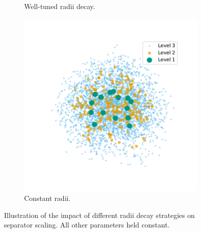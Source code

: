 \begin{figure}[tbhp]
\begin{subfigure}[t]{0.3\linewidth}
		\caption{Well-tuned radii decay.}
		\label{fig:radius_good}
	\end{subfigure}
	\hfill
	\begin{subfigure}[t]{0.3\linewidth}
		\centering
		\includegraphics[width=\linewidth]{graphics/const.pdf}
		\caption{Constant radii.}
		\label{fig:radius_const}
	\end{subfigure}
	\caption{Illustration of the impact of different radii decay strategies on separator scaling. All other parameters held constant.}
	\label{fig:radius_compare}
\end{figure}

